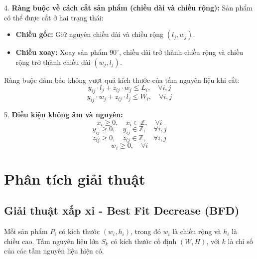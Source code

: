 \documentclass[a4paper]{article}
\begin{document}
4. \textbf{Ràng buộc về cách cắt sản phẩm (chiều dài và chiều rộng):}
Sản phẩm có thể được cắt ở hai trạng thái:
\begin{itemize}
    \item \textbf{Chiều gốc:} Giữ nguyên chiều dài và chiều rộng $(l_j, w_j)$.
    \item \textbf{Chiều xoay:} Xoay sản phẩm $90^\circ$, chiều dài trở thành chiều rộng và chiều rộng trở thành chiều dài $(w_j, l_j)$.
\end{itemize}
Ràng buộc đảm bảo không vượt quá kích thước của tấm nguyên liệu khi cắt:
\begin{equation}
y_{ij} \cdot l_j + z_{ij} \cdot w_j \leq L_i, \quad \forall i, j
\end{equation}
\begin{equation}
y_{ij} \cdot w_j + z_{ij} \cdot l_j \leq W_i, \quad \forall i, j
\end{equation}

5. \textbf{Điều kiện không âm và nguyên:}
\begin{equation}
x_i \geq 0, \quad x_i \in \mathbb{Z}, \quad \forall i
\end{equation}
\begin{equation}
y_{ij} \geq 0, \quad y_{ij} \in \mathbb{Z}, \quad \forall i, j
\end{equation}
\begin{equation}
z_{ij} \geq 0, \quad z_{ij} \in \mathbb{Z}, \quad \forall i, j
\end{equation}
\begin{equation}
w_i \geq 0, \quad \forall i
\end{equation}

\section{Phân tích giải thuật}

\subsection{Giải thuật xấp xỉ - Best Fit Decrease (BFD)}
\hspace{11pt}
Mỗi sản phẩm \( P_i \) có kích thước \((w_i, h_i)\), trong đó \( w_i \) là chiều rộng và \( h_i \) là chiều cao. Tấm nguyên liệu lớn \( S_k \) có kích thước cố định \((W, H)\), với \( k \) là chỉ số của các tấm nguyên liệu hiện có.
\end{document}
